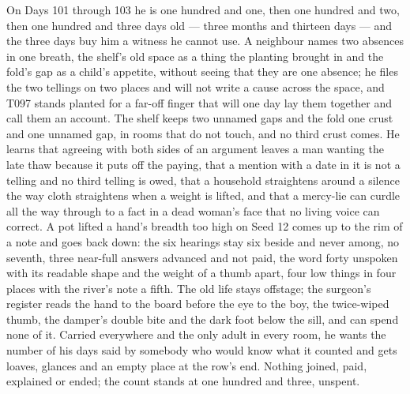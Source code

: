 \documentclass{design/chronicle}
\begin{document}
{On Days 101 through 103 he is one hundred and one, then one hundred and two, then one hundred and three days old — three months and thirteen days — and the three days buy him a witness he cannot use. A neighbour names two absences in one breath, the shelf’s old space as a thing the planting brought in and the fold’s gap as a child’s appetite, without seeing that they are one absence; he files the two tellings on two places and will not write a cause across the space, and T097 stands planted for a far-off finger that will one day lay them together and call them an account. The shelf keeps two unnamed gaps and the fold one crust and one unnamed gap, in rooms that do not touch, and no third crust comes. He learns that agreeing with both sides of an argument leaves a man wanting the late thaw because it puts off the paying, that a mention with a date in it is not a telling and no third telling is owed, that a household straightens around a silence the way cloth straightens when a weight is lifted, and that a mercy-lie can curdle all the way through to a fact in a dead woman’s face that no living voice can correct. A pot lifted a hand’s breadth too high on Seed 12 comes up to the rim of a note and goes back down: the six hearings stay six beside and never among, no seventh, three near-full answers advanced and not paid, the word forty unspoken with its readable shape and the weight of a thumb apart, four low things in four places with the river’s note a fifth. The old life stays offstage; the surgeon’s register reads the hand to the board before the eye to the boy, the twice-wiped thumb, the damper’s double bite and the dark foot below the sill, and can spend none of it. Carried everywhere and the only adult in every room, he wants the number of his days said by somebody who would know what it counted and gets loaves, glances and an empty place at the row’s end. Nothing joined, paid, explained or ended; the count stands at one hundred and three, unspent.

}
\end{document}
